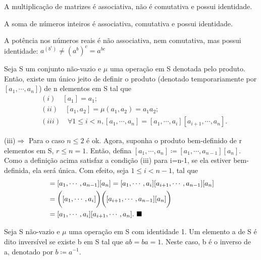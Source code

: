 \documentclass[algebra_notes.tex]{subfiles}
\begin{document}
\begin{example*}
	A multiplicação de matrizes é associativa, não é comutativa e possui identidade.
\end{example*}
\begin{example*}
	A soma de números inteiros é associativa, comutativa e possui identidade.
\end{example*}
\begin{example*}
	A potência nos números reais é não associativa, nem comutativa, mas possui identidade: $a^{(b^{c})} \neq (a^{b})^{c} = a^{bc}$
\end{example*}

\begin{prop*}
	Seja S um conjunto não-vazio e $\mu$ uma operação em S denotada pelo produto. Então, existe um único jeito de definir o
	produto (denotado temporariamente por $[a_{1}, \cdots, a_{n}]$) de n elementos em S tal que
	\begin{align*}
		 & (i)\quad [a_{1}] = a_{1};                                                                              \\
		 & (ii)\quad [a_{1}, a_{2}] = \mu(a_{1}, a_{2}) = a_{1}a_{2};                                             \\
		 & (iii)\quad\forall 1\leq{i}<n, [a_{1}, \cdots, a_{n}] = [a_{1}, \cdots, a_{i}][a_{i+1}, \cdots, a_{n}].
	\end{align*}
\end{prop*}
\begin{proof*}
	(iii)$\Rightarrow$ Para o caso $n\leq{2}$ é ok. Agora, suponha o produto bem-definido de r elementos em S, $r\leq{n=1}$. Então,
	defina $[a_{1}, \cdots, a_{n}]\coloneqq [a_{1}, \cdots, a_{n-1}][a_{n}]. $ Como a definição acima satisfaz a condição (iii) para
	i=n-1, se ela estiver bem-definida, ela será única. Com efeito, seja $1\leq{i}<n-1$, tal que
	\begin{align*}
		[a_{1}, \cdots, a_{n}] & = [a_{1}, \cdots, a_{n-1}][a_{n}] = [a_{1}, \cdots, a_{i}][a_{i+1}, \cdots, a_{n-1}][a_{n}] \\
		                       & = \biggl([a_{1}, \cdots, a_{i}]\biggr)\biggl([a_{i+1}, \cdots, a_{n-1}][a_{n}]\biggr)       \\
		                       & = [a_{1}, \cdots, a_{i}][a_{i+1}, \cdots, a_{n}].\text{ \qedsymbol}
	\end{align*}
\end{proof*}
\begin{def*}
	Seja S não-vazio e $\mu$ uma operação em S com identidade 1. Um elemento a de S é dito inversível se existe b em S tal que
	$ab = ba = 1.$ Neste caso, b é o inverso de a, denotado por $b\coloneqq a^{-1}$.
\end{def*}
\end{document}
